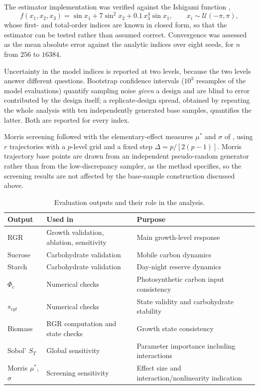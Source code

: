 \documentclass[a4paper,fleqn]{cas-sc}
\begin{document}
The estimator implementation was verified against the Ishigami function
\citep{Ishigami1990},
\begin{equation}
f(x_1,x_2,x_3) = \sin x_1 + 7\sin^2 x_2 + 0.1\,x_3^4 \sin x_1 ,
\qquad x_i \sim \mathcal{U}(-\pi,\pi),
\label{eq:ishigami}
\end{equation}
whose first- and total-order indices are known in closed form, so that the
estimator can be tested rather than assumed correct. Convergence was
assessed as the mean absolute error against the analytic indices over eight
seeds, for $n$ from $256$ to $16384$.

Uncertainty in the model indices is reported at two levels, because the two
levels answer different questions. Bootstrap confidence intervals
($10^3$ resamples of the model evaluations) quantify sampling noise
\emph{given} a design and are blind to error contributed by the design
itself; a replicate-design spread, obtained by repeating the whole analysis
with ten independently generated base samples, quantifies the latter. Both
are reported for every index.

Morris screening followed \citet{Morris1991} with the elementary-effect
measures $\mu^\ast$ and $\sigma$ of \citet{Campolongo2007}, using $r$
trajectories with a $p$-level grid and a fixed step $\Delta = p/[2(p-1)]$.
Morris trajectory base points are drawn from an independent pseudo-random
generator rather than from the low-discrepancy sampler, as the method
specifies, so the screening results are not affected by the base-sample
construction discussed above.

\begin{table}[!htbp]
\centering
\caption{Evaluation outputs and their role in the analysis.}
\label{tab:evaluation_outputs}
\begin{tabular}{lll}
\toprule
\textbf{Output} & \textbf{Used in} & \textbf{Purpose} \\
\midrule
RGR & Growth validation, ablation, sensitivity & Main growth-level response \\
Sucrose & Carbohydrate validation & Mobile carbon dynamics \\
Starch & Carbohydrate validation & Day-night reserve dynamics \\
$\Phi_c$ & Numerical checks & Photosynthetic carbon input consistency \\
$s_{cyt}$ & Numerical checks & State validity and carbohydrate stability \\
Biomass & RGR computation and state checks & Growth state consistency \\
Sobol' $S_T$ & Global sensitivity & Parameter importance including interactions \\
Morris $\mu^\ast$, $\sigma$ & Screening sensitivity & Effect size and interaction/nonlinearity indication \\
\bottomrule
\end{tabular}
\end{table}
\end{document}
